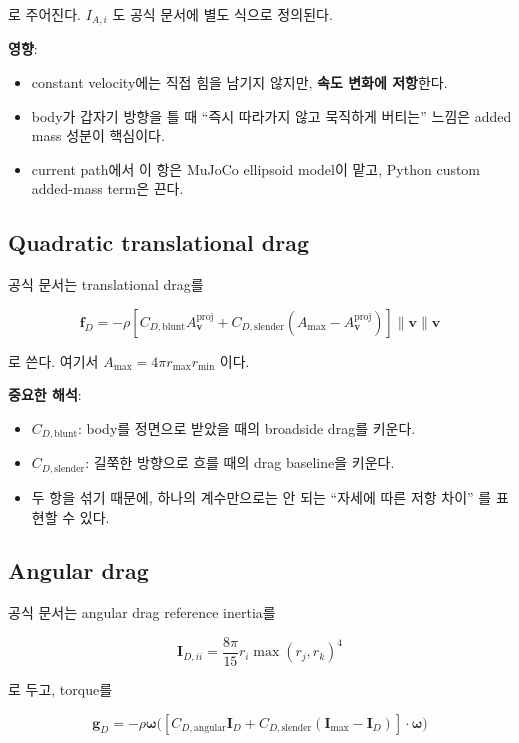 \documentclass[11pt,a4paper]{article}
\begin{document}
로 주어진다. \(I_{A,i}\) 도 공식 문서에 별도 식으로 정의된다.

\textbf{영향}:
\begin{itemize}[leftmargin=2em]
  \item constant velocity에는 직접 힘을 남기지 않지만, \textbf{속도 변화에 저항}한다.
  \item body가 갑자기 방향을 틀 때 ``즉시 따라가지 않고 묵직하게 버티는'' 느낌은 added mass 성분이 핵심이다.
  \item current path에서 이 항은 MuJoCo ellipsoid model이 맡고, Python custom added-mass term은 끈다.
\end{itemize}

\subsection{Quadratic translational drag}

공식 문서는 translational drag를

\[
\mathbf{f}_D =
- \rho
\left[
C_{D,\text{blunt}} A^{\mathrm{proj}}_{\mathbf{v}}
+
C_{D,\text{slender}}\left(A_{\max} - A^{\mathrm{proj}}_{\mathbf{v}}\right)
\right]
\|\mathbf{v}\| \mathbf{v}
\]

로 쓴다. 여기서 \(A_{\max} = 4 \pi r_{\max} r_{\min}\) 이다.

\textbf{중요한 해석}:
\begin{itemize}[leftmargin=2em]
  \item \(C_{D,\text{blunt}}\): body를 정면으로 받았을 때의 broadside drag를 키운다.
  \item \(C_{D,\text{slender}}\): 길쭉한 방향으로 흐를 때의 drag baseline을 키운다.
  \item 두 항을 섞기 때문에, 하나의 계수만으로는 안 되는 ``자세에 따른 저항 차이'' 를 표현할 수 있다.
\end{itemize}

\subsection{Angular drag}

공식 문서는 angular drag reference inertia를

\[
\mathbf{I}_{D,ii} = \frac{8\pi}{15} r_i \max(r_j, r_k)^4
\]

로 두고, torque를

\[
\mathbf{g}_D
=
- \rho \boldsymbol{\omega}
\Big(
[C_{D,\text{angular}}\mathbf{I}_D + C_{D,\text{slender}}(\mathbf{I}_{\max}-\mathbf{I}_D)]
\cdot
\boldsymbol{\omega}
\Big)
\]
\end{document}
